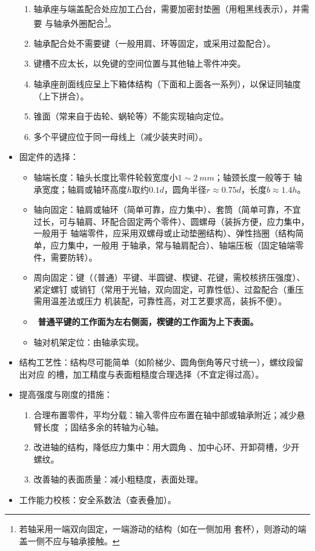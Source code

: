 \documentclass[12pt,a4paper]{article}
\newcommand{\tightlist}{\setlength{\parskip}{0pt}\setlength{\itemsep}{0pt}}
\newcommand{\hint}[1]{\textsf{（#1）}}
\newcommand{\minor}[1]{{\color{gray} #1}}
\renewcommand{\emph}[1]{\faIcon[regular]{lightbulb}\ \textbf{#1}}
\begin{document}
\begin{itemize}
\begin{enumerate}
        \item 轴承座与端盖配合处应加工凸台，需要加密封垫圈\hint{用粗黑线表示}，并需要
        与轴承外圈配合\footnote{若轴采用一端双向固定，一端游动的结构\hint{如在一侧加用
        套杯}，则游动的端盖一侧不应与轴承接触。}。
        \item 轴承配合处不需要键\hint{一般用肩、环等固定，或采用过盈配合}。
        \item 键槽不应太长，以免键的空间位置与其他轴上零件冲突。
        \item 轴承座剖面线应呈上下箱体结构\hint{下面和上面各一系列}，以保证同轴度
        \hint{上下拼合}。
        \item 锥面\hint{常来自于齿轮、蜗轮等}不能实现轴向定位。
        \item 多个平键应位于同一母线上\hint{减少装夹时间}。
    \end{enumerate}
    \item 固定件的选择：
    \begin{itemize}\tightlist
        \item 轴端长度：轴头长度比零件轮毂宽度小$1\sim\SI{2}{mm}$；轴颈长度一般等于
        轴承宽度；轴肩或轴环高度$h$取约$0.1d$，圆角半径$r\approx0.75d$，长度$b
        \approx1.4h$。
        \item 轴向固定：轴肩或轴环\hint{简单可靠，应力集中}、套筒\hint{简单可靠，不宜
        过长，可与轴肩、环配合固定两个零件}、圆螺母\hint{装拆方便，应力集中，一般用于
        轴端零件，应采用双螺母或止动垫圈结构}、弹性挡圈\hint{结构简单，应力集中，一般用
        于轴承，常与轴肩配合}、轴端压板\hint{固定轴端零件，需要防转}。
        \item 周向固定：键\hint{（普通）平键、半圆键、楔键、花键，需校核挤压强度}、紧定螺钉
        或销钉\hint{常用于光轴，双向固定，可靠性低}、过盈配合\hint{重压需用温差法或压力
        机装配，可靠性高，对工艺要求高，装拆不便}。
        \item \emph{普通平键的工作面为左右侧面，楔键的工作面为上下表面。}
        \item 轴对机架定位：由轴承实现。
    \end{itemize}
    \item 结构工艺性：结构尽可能简单\hint{如阶梯少、圆角倒角等尺寸统一}，螺纹段留出对应
    的槽，加工精度与表面粗糙度合理选择\hint{不宜定得过高}。
    \item 提高强度与刚度的措施：
    \begin{enumerate}\tightlist
        \item 合理布置零件，平均分载：输入零件应布置在轴中部或轴承附近；减少悬臂长度
        \minor{；固结多余的转轴为心轴}。
        \item 改进轴的结构，降低应力集中：用大圆角\minor{、加中心环、开卸荷槽，少开
        螺纹}。
        \item 改善轴的表面质量：减小粗糙度，表面处理。
    \end{enumerate}
    \item \minor{工作能力校核：安全系数法\hint{查表叠加}。}
\end{itemize}
\end{document}
